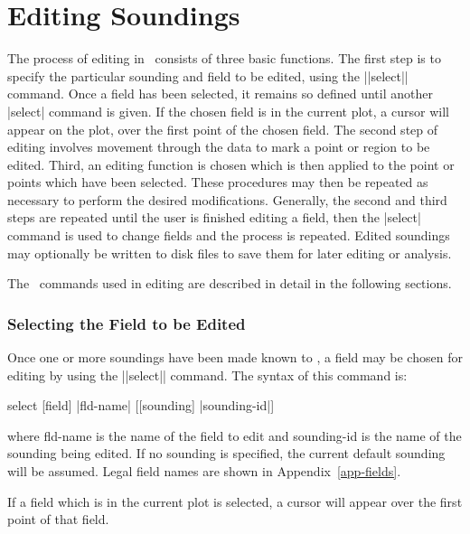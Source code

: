 \part{Editing Soundings}
The process of editing in \suds\ consists of three basic functions.  
The first step is to specify the particular sounding and field
to be edited, using the ||select|| command.  Once a field has been selected,
it remains so defined until another |select|
command is given.  If the chosen field is in the current plot, a cursor
will appear on the plot, over the first point of the chosen field.
The second step of editing involves movement through the data to mark a point 
or region to be edited. 
Third, an editing function is chosen which is then
applied to the point or points which have been selected.  These procedures 
may then be repeated as necessary to perform the desired modifications.
Generally, the second and third steps are repeated until the user is finished
editing a field, then the |select| command is used to change fields and
the process is repeated.  Edited soundings may optionally be written to
disk files to save them for later editing or analysis.

The \suds\ commands used in editing are described in detail in the following
sections.

\section{Selecting the Field to be Edited}
Once one or more soundings have been made known to \suds, a field may be 
chosen for editing by using the ||select|| command.  The syntax of this 
command is:
\begin{example}
	select [field] |fld-name| [[sounding] |sounding-id|]
\end{example}
where {\pf fld-name} is the name of the field to edit and 
{\pf sounding-id} is the name of the sounding being edited.  If no sounding 
is specified, the current default sounding will be assumed.  Legal field 
names are shown in Appendix~\ref{app-fields}.

If a field which is in the current plot is selected, a cursor will appear 
over the first point of that field.

